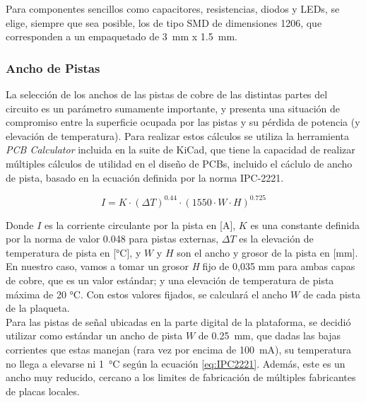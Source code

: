 Para componentes sencillos como capacitores, resistencias, diodos y LEDs, se elige, siempre que sea posible, los de tipo SMD de dimensiones 1206, que corresponden a un empaquetado de \SI[]{3}[]{\milli\metre} x \SI[]{1.5}[]{\milli\metre}.\\

\subsubsection{Ancho de Pistas}

La selección de los anchos de las pistas de cobre de las distintas partes del circuito es un parámetro sumamente importante, y presenta una situación de compromiso entre la superficie ocupada por las pistas y su pérdida de potencia (y elevación de temperatura). Para realizar estos cálculos se utiliza la herramienta \textit{PCB Calculator} incluida en la suite de KiCad, que tiene la capacidad de realizar múltiples cálculos de utilidad en el diseño de PCBs, incluido el cáclulo de ancho de pista, basado en la ecuación definida por la norma IPC-2221.

\begin{equation}\label{eq:IPC2221}
    I = K\cdot (\Delta T)^{\num{0.44}}\cdot (\num{1550}\cdot W\cdot H)^{\num{0.725}}
\end{equation}

Donde $I$ es la corriente circulante por la pista en [\unit{\ampere}], $K$ es una constante definida por la norma de valor \num{0.048} para pistas externas, $\Delta T$ es la elevación de temperatura de pista en [\unit{\celsius}], y $W$ y $H$ son el ancho y grosor de la pista en [\unit{\milli\metre}].\\

En nuestro caso, vamos a tomar un {\Medium grosor \textit{H} fijo de 0,035 mm} para ambas capas de cobre, que es un valor estándar; y una {\Medium elevación de temperatura de pista máxima de 20 °C}. Con estos valores fijados, se calculará el ancho $W$ de cada pista de la plaqueta.\\

Para las pistas de señal ubicadas en la parte digital de la plataforma, se decidió utilizar como estándar un ancho de pista $W$ de \SI[]{0.25}[]{\milli\metre}, que dadas las bajas corrientes que estas manejan (rara vez por encima de \SI[]{100}[]{\milli\ampere}), su temperatura no llega a elevarse ni \SI[]{1}[]{\celsius} según la ecuación \ref{eq:IPC2221}. Además, este es un ancho muy reducido, cercano a los limites de fabricación de múltiples fabricantes de placas locales.\\